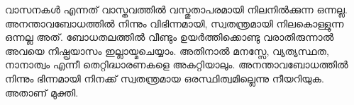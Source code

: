 വാസനകള്‍ എന്നത് വാസ്തവത്തില്‍ വസ്തുതാപരമായി നിലനില്‍ക്കുന്ന ഒന്നല്ല. അനന്താവബോധത്തില്‍ നിന്നും വിഭിന്നമായി, സ്വതന്ത്രമായി നിലകൊള്ളുന്ന ഒന്നല്ല അത്. ബോധതലത്തില്‍ വീണ്ടും ഉയര്‍ത്തിക്കൊണ്ടു വരാതിരുന്നാല്‍ അവയെ നിഷ്പ്രയാസം ഇല്ലായ്മചെയ്യാം. അതിനാല്‍ മനസ്സേ, വ്യത്യസ്ഥത, നാനാത്വം എന്നീ തെറ്റിദ്ധാരണകളെ അകറ്റിയാലും. അനന്താവബോധത്തില്‍ നിന്നും ഭിന്നമായി നിനക്ക് സ്വതന്ത്രമായ ഒരസ്ഥിത്വമില്ലെന്നു നീയറിയുക. അതാണ്‌ മുക്തി.

